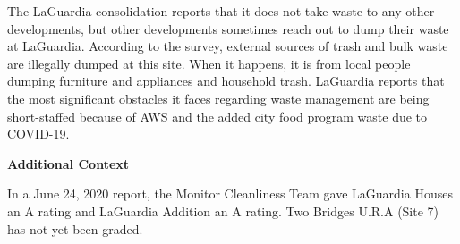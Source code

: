 The LaGuardia consolidation reports that it does not take waste to any other developments, but other developments sometimes reach out to dump their waste at LaGuardia. According to the survey, external sources of trash and bulk waste are illegally dumped at this site. When it happens, it is from local people dumping furniture and appliances and household trash. LaGuardia reports that the most significant obstacles it faces regarding waste management are being short-staffed because of AWS and the added city food program waste due to COVID-19.

\textbf{Additional Context} 

In a June 24, 2020 report, the Monitor Cleanliness Team gave LaGuardia Houses an A rating and LaGuardia Addition an A rating. Two Bridges U.R.A (Site 7) has not yet been graded. 